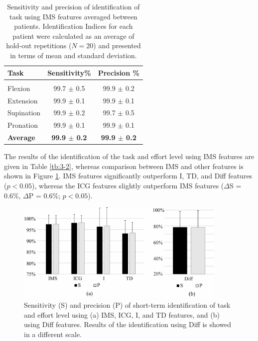 \begin{table}[h!]
\centering
\caption{Sensitivity and precision of identification of task using IMS features averaged between patients. Identification Indices for each patient were calculated as an average of hold-out repetitions ($N = 20$) and presented in terms of mean and standard deviation.}
\small
\vspace{3mm}
\label{tb:3-1}
\begin{threeparttable}
\begin{tabular}{lcc}
Task       & Sensitivity\%           & Precision \% \\ \hline
              &                &                                              \\
Flexion             & 99.7 $\pm$ 0.5             & 99.9 $\pm$ 0.2                      \\
Extension             & 99.9 $\pm$ 0.1             & 99.9 $\pm$ 0.1                      \\
Supination             & 99.9 $\pm$ 0.2             & 99.7 $\pm$ 0.5                          \\
Pronation             & 99.9 $\pm$ 0.1            & 99.9 $\pm$ 0.1             \\
\textbf{Average}             & \textbf{99.9 $\pm$ 0.2}             & \textbf{99.9 $\pm$ 0.2}           
\end{tabular}
    \end{threeparttable}
\end{table}


The results of the identification of the task and effort level using IMS features are given in Table \ref{tb:3-2}, whereas comparison between IMS and other features is shown in Figure \ref{fig:3-7}. IMS features significantly outperform I, TD, and Diff features ($p < 0.05$), whereas the ICG features slightly outperform IMS features ($\Delta$S = 0.6\%, $\Delta$P = 0.6\%; $p < 0.05$).

\begin{figure}[ht]
\centering
\includegraphics[width=0.9\textwidth]{Images/figure3_7.png}
\caption{Sensitivity (S) and precision (P) of short-term identification of task and effort level using (a) IMS, ICG, I, and TD features, and (b) using Diff features. Results of the identification using Diff is showed in a different scale.}
\label{fig:3-7}
\end{figure}   

